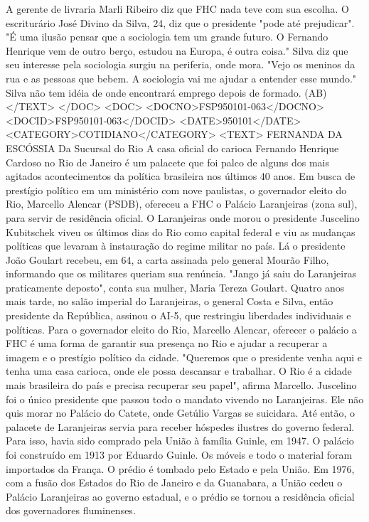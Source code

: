 A gerente de livraria Marli Ribeiro diz que FHC nada teve com sua escolha.
O escriturário José Divino da Silva, 24, diz que o presidente "pode até prejudicar". "É uma ilusão pensar que a sociologia tem um grande futuro. O Fernando Henrique vem de outro berço, estudou na Europa, é outra coisa."
Silva diz que seu interesse pela sociologia surgiu na periferia, onde mora. "Vejo os meninos da rua e as pessoas que bebem. A sociologia vai me ajudar a entender esse mundo." Silva não tem idéia de onde encontrará emprego depois de formado.
(AB)
</TEXT>
</DOC>
<DOC>
<DOCNO>FSP950101-063</DOCNO>
<DOCID>FSP950101-063</DOCID>
<DATE>950101</DATE>
<CATEGORY>COTIDIANO</CATEGORY>
<TEXT>
FERNANDA DA ESCÓSSIA 
Da Sucursal do Rio 
A casa oficial do carioca Fernando Henrique Cardoso no Rio de Janeiro é um palacete que foi palco de alguns dos mais agitados acontecimentos da política brasileira nos últimos 40 anos.
Em busca de prestígio político em um ministério com nove paulistas, o governador eleito do Rio, Marcello Alencar (PSDB), ofereceu a FHC o Palácio Laranjeiras (zona sul), para servir de residência oficial.
O Laranjeiras onde morou o presidente Juscelino Kubitschek viveu os últimos dias do Rio como capital federal e viu as mudanças políticas que levaram à instauração do regime militar no país.
Lá o presidente João Goulart recebeu, em 64, a carta assinada pelo general Mourão Filho, informando que os militares queriam sua renúncia.
"Jango já saiu do Laranjeiras praticamente deposto", conta sua mulher, Maria Tereza Goulart.
Quatro anos mais tarde, no salão imperial do Laranjeiras, o general Costa e Silva, então presidente da República, assinou o AI-5, que restringiu liberdades individuais e políticas.
Para o governador eleito do Rio, Marcello Alencar, oferecer o palácio a FHC é uma forma de garantir sua presença no Rio e ajudar a recuperar a imagem e o prestígio político da cidade.
"Queremos que o presidente venha aqui e tenha uma casa carioca, onde ele possa descansar e trabalhar. O Rio é a cidade mais brasileira do país e precisa recuperar seu papel", afirma Marcello.
Juscelino foi o único presidente que passou todo o mandato vivendo no Laranjeiras. Ele não quis morar no Palácio do Catete, onde Getúlio Vargas se suicidara.
Até então, o palacete de Laranjeiras servia para receber hóspedes ilustres do governo federal. Para isso, havia sido comprado pela União à família Guinle, em 1947.
O palácio foi construído em 1913 por Eduardo Guinle. Os móveis e todo o material foram importados da França. O prédio é tombado pelo Estado e pela União.
Em 1976, com a fusão dos Estados do Rio de Janeiro e da Guanabara, a União cedeu o Palácio Laranjeiras ao governo estadual, e o prédio se tornou a residência oficial dos governadores fluminenses.

